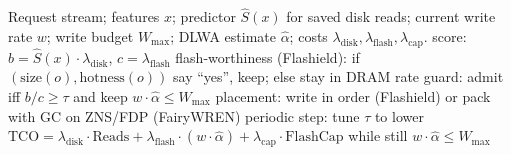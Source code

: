 \begin{algorithm}[H]
\caption{Bucket C: Endurance/TCO-aware admission (simple sketch)}
\begin{algorithmic}[1]
\Require Request stream; features $x$; predictor $\widehat{S}(x)$ for saved disk reads; current write rate $w$; write budget $W_{\max}$; DLWA estimate $\widehat{\alpha}$; costs $\lambda_{\text{disk}},\lambda_{\text{flash}},\lambda_{\text{cap}}$.
  \State score: $b=\widehat{S}(x)\cdot \lambda_{\text{disk}}$, $c=\lambda_{\text{flash}}$
  \State flash-worthiness (Flashield): if $(\text{size}(o),\text{hotness}(o))$ say ``yes'', keep; else stay in DRAM
  \State rate guard: admit iff $b/c \ge \tau$ and keep $w\cdot\widehat{\alpha} \le W_{\max}$
  \State placement: write in order (Flashield) or pack with GC on ZNS/FDP (FairyWREN)
\EndFor
\State periodic step: tune $\tau$ to lower $\mathrm{TCO}=\lambda_{\text{disk}}\cdot\mathrm{Reads}+\lambda_{\text{flash}}\cdot(w\cdot\widehat{\alpha})+\lambda_{\text{cap}}\cdot\mathrm{FlashCap}$ while still $w\cdot\widehat{\alpha} \le W_{\max}$
\end{algorithmic}
\end{algorithm}
\small
